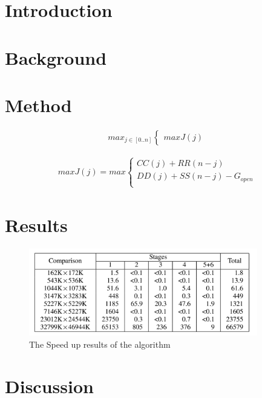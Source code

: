 \section{Introduction}

\section{Background}

\section{Method}
  

\begin{align}
\label{MM}
	max_{j\in [0..n]}
 \begin{cases}
	 maxJ(j)
 \end{cases}
\end{align}

\begin{align}
\label{MM_2}
	maxJ(j) = max
 \begin{cases}
	 CC(j) + RR(n-j) \\
	 DD(j) + SS(n-j) - G_{open} \\
 \end{cases}
\end{align}




\section{Results}
\begin{figure}[H]
    \centering
    \includegraphics[height=1.5in]{image/runTime_stages.jpg}
    \caption{The Speed up results of the algorithm\cite{cuda2}}
    \label{fig:cuda2_stages}
\end{figure}

\section{Discussion}



